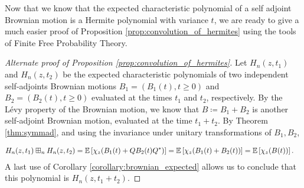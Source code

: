 



    Now that we know that the expected characteristic polynomial of a self adjoint Brownian motion is a Hermite polynomial with variance $t$, we are ready to give a much easier proof of Proposition \ref{prop:convolution_of_hermites} using the tools of Finite Free Probability Theory.

    \begin{proof}[Alternate proof of Proposition \ref{prop:convolution_of_hermites}]
        Let $H_n(z,t_1)$ and $H_n(z,t_2)$ be the expected characteristic polynomials of two independent self-adjoints Brownian motions $B_1 = (B_1(t), t\ge 0)$ and  $B_2 = (B_2 (t), t\ge0)$ evaluated at the times $t_1$ and $t_2$, respectively. By the Lévy property of the Brownian motion, we know that $B \coloneqq B_1 + B_2$ is another self-adjoint Brownian motion, evaluated at the time $t_1 + t_2$. By Theorem \ref{thm:symmad}, and using the invariance under unitary transformations of $B_1, B_2$, 

        \begin{align*}
            H_n(z,t_1) \boxplus_n H_n(z,t_2) &= \mathbb E \left[  \chi_{z}(B_1(t) + Q B_2(t) Q^*)  \right] = \mathbb E \left[  \chi_{z}(B_1(t) + B_2(t))  \right] = \mathbb E \left[ \chi_z(B(t)) \right]. 
        \end{align*}
        A last use of Corollary \ref{corollary:brownian_expected} allows us to conclude that this polynomial is $H_n(z,t_1 + t_2)$.
    \end{proof}

